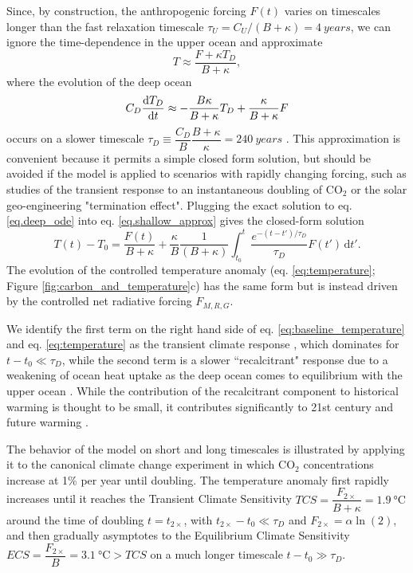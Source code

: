 \documentclass[9pt,twocolumn,twoside,lineno]{pnas-new}
\begin{document}
{Since, by construction, the anthropogenic forcing $F(t)$ varies on timescales longer than the fast relaxation timescale $\tau_{U} = C_{U}/(B + \kappa) = \SI{4}{years}$, we can ignore the time-dependence in the upper ocean and approximate
\begin{equation}
    T \approx \frac{F+\kappa T_{D}}{B + \kappa},
    \label{eq.shallow_approx}
\end{equation}
where the evolution of the deep ocean
\begin{equation}
    C_{D} \dv{T_{D}}{t} \approx - \frac{B \kappa}{B + \kappa} T_{D} + \frac{\kappa}{B + \kappa} F
    \label{eq.deep_ode}
\end{equation}
occurs on a slower timescale $\tau_{D} \equiv \dfrac{C_{D}}{B} \dfrac{B + \kappa}{\kappa} = \SI{240}{years}$ \citep{held_probing_2010}. This approximation is convenient because it permits a simple closed form solution, but should be avoided if the model is applied to scenarios with rapidly changing forcing, such as studies of the transient response to an instantaneous doubling of CO$_{2}$ or the solar geo-engineering "termination effect". Plugging the exact solution to eq. \ref{eq.deep_ode} into eq. \ref{eq.shallow_approx} gives the closed-form solution
\begin{equation}
    T(t) - T_{0} = \frac{F(t)}{B + \kappa} + \frac{\kappa}{B} \frac{1}{(B+\kappa)} \int_{t_{0}}^{t} \frac{ e^{-(t-t')/\tau_{D}}}{\tau_{D}} F(t') \, \text{d}t'.\label{eq:baseline_temperature}
\end{equation}
The evolution of the controlled temperature anomaly (eq. \ref{eq:temperature}; Figure \ref{fig:carbon_and_temperature}c) has the same form but is instead driven by the controlled net radiative forcing $F_{M,R,G}$.

We identify the first term on the right hand side of eq. \ref{eq:baseline_temperature} and eq. \ref{eq:temperature} as the transient climate response \citep{gregory_transient_2008}, which dominates for $t-t_{0} \ll \tau_{D}$, while the second term is a slower ``recalcitrant" response due to a weakening of ocean heat uptake as the deep ocean comes to equilibrium with the upper ocean \citep{held_probing_2010}. While the contribution of the recalcitrant component to historical warming is thought to be small, it contributes significantly to 21st century and future warming \citep{gregory_transient_2008,held_probing_2010}.

The behavior of the model on short and long timescales is illustrated by applying it to the canonical climate change experiment in which CO$_{2}$ concentrations increase at 1\% per year until doubling. The temperature anomaly first rapidly increases until it reaches the Transient Climate Sensitivity $TCS = \dfrac{F_{2\times}}{B + \kappa} = \SI{1.9}{\celsius}$ around the time of doubling $t=t_{2\times}$, with $t_{2\times} - t_{0} \ll \tau_{D}$ and $F_{2\times} = \alpha \ln(2)$, and then gradually asymptotes to the Equilibrium Climate Sensitivity $ECS = \dfrac{F_{2\times}}{B} = \SI{3.1}{\celsius} > TCS$ on a much longer timescale $t-t_{0} \gg \tau_{D}$.

}
\end{document}
